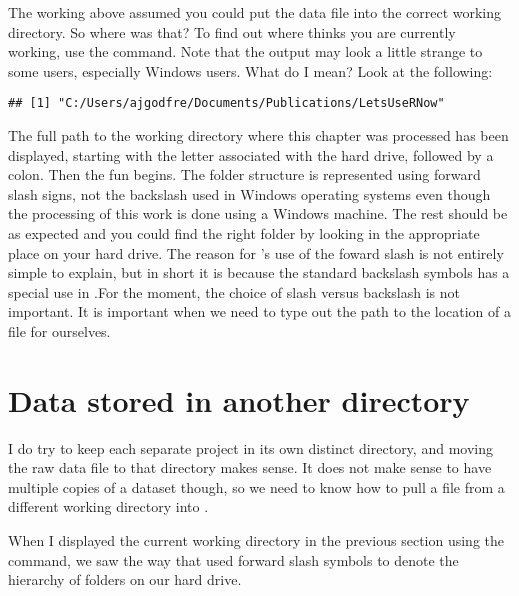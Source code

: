The working above assumed you could put the data file into the correct working directory.  So where was that? To find out where \R{} thinks you are currently working, use the  command. Note that the output may look a little strange to some users, especially Windows users. What do I mean? Look at the following: 
\begin{knitrout}
\color{fgcolor}\begin{kframe}
\begin{alltt}
\hlstd{()}
\end{alltt}
\begin{verbatim}
## [1] "C:/Users/ajgodfre/Documents/Publications/LetsUseRNow"
\end{verbatim}
\end{kframe}
\end{knitrout}
 
The full path to the working directory where this chapter was processed has been displayed, starting with the letter associated with the hard drive, followed by a colon. Then the fun begins. The folder structure is represented using forward slash signs, not the backslash used in Windows operating systems even though the processing of this work is done using a Windows machine. The rest should be as expected and you could find the right folder by looking in the appropriate place on your hard drive. The reason for \R{}'s use of the foward slash is not entirely simple to explain, but in short it is because the standard backslash symbols has a special use  in \R{}.For the moment, the choice of slash versus backslash is not important. It is important when we need to type out the path to the location of a file for ourselves. 
 
 
 
\section{Data stored in another directory} 
 
 
I do try to keep each separate project in its own distinct directory, and moving the raw data file to that directory makes sense. It does not make sense to have multiple copies of a dataset though, so we need to know how to pull a file from a different working directory into \R{}. 
 
When I displayed the current working directory in the previous section using the  command, we saw the way that \R{} used forward slash symbols to denote the hierarchy of folders on our hard drive. 
 
